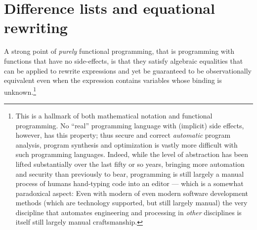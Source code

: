 \section*{Difference lists and equational rewriting}

A strong point of \emph{purely} functional programming, that is programming with functions that have no side-effects, is that they satisfy algebraic equalities that can be applied to rewrite expressions and yet be guaranteed to be observationally equivalent even when the expression contains variables whose binding is unknown.\footnote{This is a hallmark of both mathematical notation and functional programming. No ``real'' programming language with (implicit) side effects, however, has this property; thus secure and correct \emph{automatic} program analysis, program synthesis and optimization is vastly more difficult with such programming languages.  Indeed, while the level of abstraction has been lifted substantially over the last fifty or so years, bringing more automation and security than previously to bear, programming is still largely a manual process of humans hand-typing code into an editor --- which is a somewhat paradoxical aspect:  Even with modern of even modern software development methods (which are technology supported, but still largely manual) the very discipline that automates engineering and processing in \emph{other} disciplines is itself still largely manual craftsmanship.}

